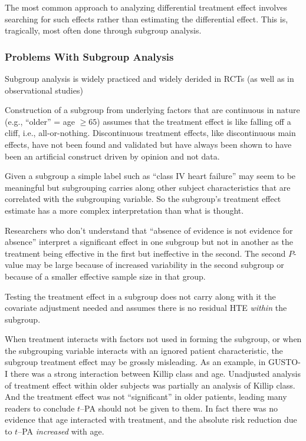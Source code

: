 The most common approach to analyzing differential treatment effect
involves searching for such effects rather than estimating the
differential effect.  This is, tragically, most often done through
subgroup analysis.

\subsubsection{Problems With Subgroup Analysis}
\bi
\item   Subgroup analysis is widely practiced and widely derided in
  RCTs (as well as in observational studies)
\item Construction of a subgroup from underlying factors that are
  continuous in nature (e.g., ``older'' = age $\geq 65$) assumes that
  the treatment effect is like falling off a cliff, i.e.,
  all-or-nothing.  Discontinuous treatment effects, like discontinuous
  main effects, have not been found and validated but have always been
  shown to have been an artificial construct driven by opinion and not data.
\item Given a subgroup a simple label such as ``class IV heart
  failure'' may seem to be meaningful but subgrouping carries along other
  subject characteristics that are correlated with the subgrouping
  variable.  So the subgroup's treatment effect estimate has a more
  complex interpretation than what is thought.
\item Researchers who don't understand that ``absence of evidence is
  not evidence for absence'' interpret a significant effect in one
  subgroup but not in another as the treatment being effective in the
  first but ineffective in the second.  The second $P$-value may be
  large because of increased variability in the second subgroup or
  because of a smaller effective sample size in that group.
\item Testing the treatment effect in a subgroup does not carry along
  with it the covariate adjustment needed and assumes there is no
  residual HTE \emph{within} the subgroup.
\item When treatment interacts with factors not used in forming the
  subgroup, or when the subgrouping variable interacts with an
  ignored patient characteristic, the subgroup
  treatment effect may be grossly misleading.  As an example, in
  GUSTO-I there was a strong interaction between Killip class and
  age.  Unadjusted analysis of treatment effect within older subjects was
  partially an analysis of Killip class.  And the treatment effect was
  not ``significant'' in older patients, leading many readers to
  conclude $t$--PA should not be given to them.  In fact
  there was no evidence that age interacted with treatment, and the
  absolute risk reduction due to $t$--PA \emph{increased} with age.
\ei

